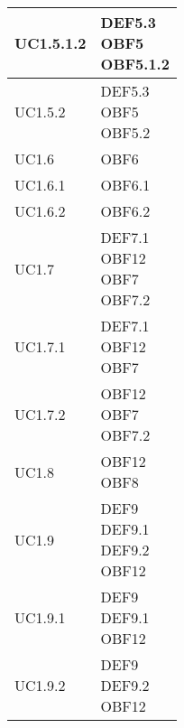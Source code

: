 \documentclass{scalatekids-article}
\begin{document}
\begin{longtable}[H]{|p{5.5cm}|p{5.5cm}|}
  \hline
  UC1.5.1.2 & \multiLineCell[t]{DEF5.3\\OBF5\\OBF5.1.2\\}\\
  \hline
  UC1.5.2 & \multiLineCell[t]{DEF5.3\\OBF5\\OBF5.2\\}\\
  \hline
  UC1.6 & \multiLineCell[t]{OBF6\\}\\
  \hline
  UC1.6.1 & \multiLineCell[t]{OBF6.1\\}\\
  \hline
  UC1.6.2 & \multiLineCell[t]{OBF6.2\\}\\
  \hline
  UC1.7 & \multiLineCell[t]{DEF7.1\\OBF12\\OBF7\\OBF7.2\\}\\
  \hline
  UC1.7.1 & \multiLineCell[t]{DEF7.1\\OBF12\\OBF7\\}\\
  \hline
  UC1.7.2 & \multiLineCell[t]{OBF12\\OBF7\\OBF7.2\\}\\
  \hline
  UC1.8 & \multiLineCell[t]{OBF12\\OBF8\\}\\
  \hline
  UC1.9 & \multiLineCell[t]{DEF9\\DEF9.1\\DEF9.2\\OBF12\\}\\
  \hline
  UC1.9.1 & \multiLineCell[t]{DEF9\\DEF9.1\\OBF12\\}\\
  \hline
  UC1.9.2 & \multiLineCell[t]{DEF9\\DEF9.2\\OBF12\\}\\
  \hline

\end{longtable}
\end{document}
